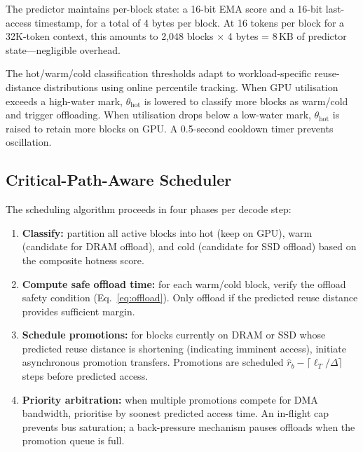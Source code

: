 \documentclass[acmsmall,nonacm,screen]{acmart}
\begin{document}
The predictor maintains per-block state: a 16-bit EMA score and a 16-bit
last-access timestamp, for a total of 4 bytes per block.  At 16 tokens
per block for a 32K-token context, this amounts to 2{,}048 blocks $\times$
4 bytes = 8\,KB of predictor state---negligible overhead.

The hot/warm/cold classification thresholds adapt to workload-specific
reuse-distance distributions using online percentile tracking.  When GPU
utilisation exceeds a high-water mark, $\theta_\text{hot}$ is lowered to
classify more blocks as warm/cold and trigger offloading.  When utilisation
drops below a low-water mark, $\theta_\text{hot}$ is raised to retain more
blocks on GPU.  A 0.5-second cooldown timer prevents oscillation.

\subsection{Critical-Path-Aware Scheduler}\label{sec:design:scheduler}

The scheduling algorithm proceeds in four phases per decode step:

\begin{enumerate}
  \item \textbf{Classify:} partition all active blocks into hot (keep on GPU),
    warm (candidate for DRAM offload), and cold (candidate for SSD offload)
    based on the composite hotness score.

  \item \textbf{Compute safe offload time:} for each warm/cold block, verify
    the offload safety condition (Eq.~\ref{eq:offload}).  Only offload if
    the predicted reuse distance provides sufficient margin.

  \item \textbf{Schedule promotions:} for blocks currently on DRAM or SSD
    whose predicted reuse distance is shortening (indicating imminent access),
    initiate asynchronous promotion transfers.  Promotions are scheduled
    $\hat{r}_b - \lceil \ell_T / \Delta \rceil$ steps before predicted access.

  \item \textbf{Priority arbitration:} when multiple promotions compete for
    DMA bandwidth, prioritise by soonest predicted access time.  An in-flight
    cap prevents bus saturation; a back-pressure mechanism pauses offloads
    when the promotion queue is full.
\end{enumerate}
\end{document}
